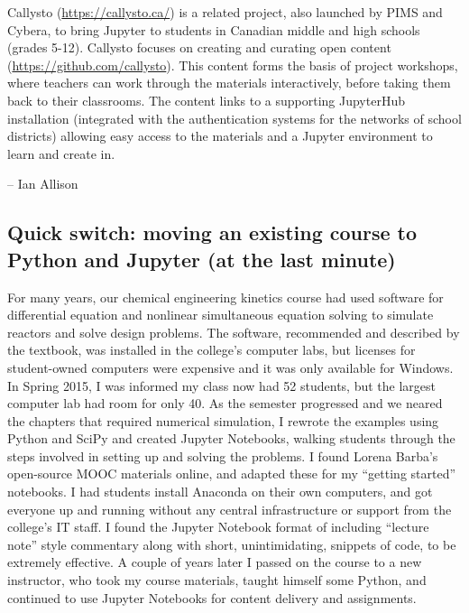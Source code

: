 \documentclass[]{book}
\begin{document}
Callysto (\url{https://callysto.ca/}) is a related project, also
launched by PIMS and Cybera, to bring Jupyter to students in Canadian
middle and high schools (grades 5-12). Callysto focuses on creating and
curating open content (\url{https://github.com/callysto}). This content
forms the basis of project workshops, where teachers can work through
the materials interactively, before taking them back to their
classrooms. The content links to a supporting JupyterHub installation
(integrated with the authentication systems for the networks of school
districts) allowing easy access to the materials and a Jupyter
environment to learn and create in.

-- Ian Allison

\subsection{Quick switch: moving an existing course to Python and
Jupyter (at the last
minute)}\label{quick-switch-moving-an-existing-course-to-python-and-jupyter-at-the-last-minute}

For many years, our chemical engineering kinetics course had used
software for differential equation and nonlinear simultaneous equation
solving to simulate reactors and solve design problems. The software,
recommended and described by the textbook, was installed in the
college's computer labs, but licenses for student-owned computers were
expensive and it was only available for Windows. In Spring 2015, I was
informed my class now had 52 students, but the largest computer lab had
room for only 40. As the semester progressed and we neared the chapters
that required numerical simulation, I rewrote the examples using Python
and SciPy and created Jupyter Notebooks, walking students through the
steps involved in setting up and solving the problems. I found Lorena
Barba's open-source MOOC materials online, and adapted these for my
``getting started'' notebooks. I had students install Anaconda on their
own computers, and got everyone up and running without any central
infrastructure or support from the college's IT staff. I found the
Jupyter Notebook format of including ``lecture note'' style commentary
along with short, unintimidating, snippets of code, to be extremely
effective. A couple of years later I passed on the course to a new
instructor, who took my course materials, taught himself some Python,
and continued to use Jupyter Notebooks for content delivery and
assignments.
\end{document}
